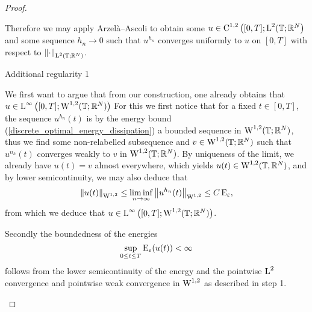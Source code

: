 \begin{proof}
\begin{description}[wide=0pt]
	Therefore we may apply Arzelà--Ascoli to obtain some $ u \in \operatorname{C}^{ 1 , 2 } \left( [ 0, T ] ; \operatorname{L}^{ 2 } ( \operatorname{\mathbb{T}} ; \mathbb{ R }^{ N } \right) $ and some  sequence $ h_{ n } \to 0 $ such that
	$ u^{ h_{ n } } $ converges uniformly to $ u $ on $ [ 0 , T ] $ with respect to $ \norm{ \cdot }_{ \operatorname{L}^{ 2 } ( \operatorname{\mathbb{T}} ; \mathbb{ R }^{ N } ) } $.
	
	\item[Step 6:] Additional regularity 1
	
	We first want to argue that from our construction, one already obtains that $ u \in \operatorname{L}^{ \infty } \left( [ 0 , T ] ; \operatorname{W}^{ 1, 2 } ( \operatorname{\mathbb{T}} ; \mathbb{ R }^{ N } ) \right) $
	For this we first notice that for a fixed $ t \in [ 0 , T ] $, the sequence $ u^{ h_{ n } } ( t ) $ is by the energy bound (\ref{discrete_optimal_energy_dissipation}) a bounded sequence in $ \operatorname{W}^{ 1 , 2 } ( \operatorname{\mathbb{T}} ; \mathbb{ R }^{ N } ) $, thus we find some non-relabelled subsequence and $ v \in \operatorname{W}^{ 1 , 2 } ( \operatorname{\mathbb{T}} ; \mathbb{ R }^{ N } ) $ such that $ u^{ n_{h } } ( t ) $ converges weakly to $ v $ in $ \operatorname{W}^{ 1 , 2 } ( \operatorname{\mathbb{T}} ; \mathbb{ R }^{ N } ) $. By uniqueness of the limit, we already have $ u ( t ) = v $ almost everywhere, which yields $ u ( t ) \in \operatorname{W}^{ 1 , 2 } ( \operatorname{\mathbb{T}}, \mathbb{ R }^{ N } ) $, and by lower semicontinuity, we may also deduce that
	\begin{equation*}
		\norm{ u ( t ) }_{ \operatorname{W}^{ 1 , 2 } }
		\leq
		\liminf_{ n \to \infty }
			\norm{ u^{ h_{ n } } ( t ) }_{ \operatorname{W}^{ 1 , 2 } }
		\leq
		C \operatorname{E}_{ \varepsilon },
	\end{equation*}
	from which we deduce that $ u \in \operatorname{L}^{ \infty } \left( [ 0 , T ] ; \operatorname{W}^{ 1 , 2 } ( \operatorname{\mathbb{T}} ; \mathbb{ R }^{ N } ) \right) $.	
	
	Secondly the boundedness of the energies
	\begin{equation*}
		\sup_{ 0 \leq t \leq T }
			\operatorname{E}_{ \varepsilon } ( u ( t ) ) 
		< \infty
	\end{equation*}
	follows from the lower semicontinuity of the energy and the pointwise $ \operatorname{L}^{ 2 } $ convergence and pointwise weak convergence in $ \operatorname{W}^{ 1 , 2 } $ as described in step 1.
	

\end{description}
\end{proof}
